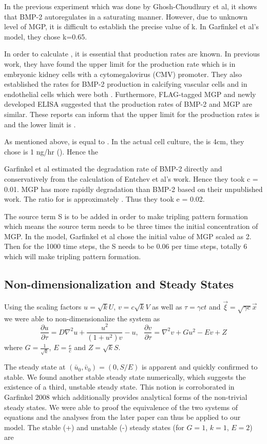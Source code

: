 \documentclass{article}
\begin{document}
In the previous experiment which was done by Ghosh-Choudhury et al, it shows that BMP-2 autoregulates in a saturating manner. However, due to unknown level of MGP, it is difficult to establish the precise value of k. In Garfinkel et al’s model, they chose k=0.65.

In order to calculate , it is essential that production rates are known. In previous work, they have found the upper limit for the production rate which is in embryonic kidney cells with a cytomegalovirus (CMV) promoter. They also established the rates for BMP-2 production in calcifying vascular cells and in endothelial cells which were both . Furthermore, FLAG-tagged MGP and newly developed ELISA suggested that the production rates of BMP-2 and MGP are similar. These reports can inform that the upper limit for the production rates is  and the lower limit is .

 As mentioned above,  is equal to . In the actual cell culture, the is 4cm,  they chose is 1 ng/hr (). Hence the 

Garfinkel et al estimated the degradation rate of BMP-2 directly and conservatively from the calculation of Entchev et al’s work. Hence they took c = 0.01. MGP has more rapidly degradation than BMP-2 based on their unpublished work. The ratio for  is approximately . Thus they took e = 0.02.

The source term S is to be added in order to make tripling pattern formation which means the source term needs to be three times the initial concentration of MGP. In the model, Garfinkel et al chose the initial value of MGP scaled as 2. Then for the 1000 time steps, the S needs to be 0.06 per time steps, totally 6 which will make tripling pattern formation.

\subsection{Non-dimensionalization and Steady States}

Using the scaling factors $u=\sqrt{k}U$, $v=c\sqrt{k}V$ as well as $\tau = \gamma c t$ and $\vec{\xi}=\sqrt{\gamma c} \vec{x}$ we were able to non-dimensionalize the system as
$$\frac{\partial u}{\partial \tau} = D\nabla^2 u + \frac{u^2}{(1+u^2)v}-u,\ \ \ \frac{\partial v}{\partial \tau} = \nabla^2 v + G u^2 - E v + Z$$
where $G=\frac{1}{\sqrt{k}}$, $E=\frac{e}{c}$ and $Z=\sqrt{k}S$.


The steady state at $(\bar u_0,\bar v_0)=(0,S/E)$ is apparent and quickly confirmed to stable. We found another stable steady state numerically, which suggests the existence of a third, unstable steady state.
This notion is corroborated in Garfinkel 2008 which additionally provides analytical forms of the non-trivial steady states. We were able to proof the equivalence of the two systems of equations and the analyses from the later paper can thus be applied to  our model. The stable (+) and unstable (-) steady states (for $G=1$, $k=1$, $E=2$) are
\end{document}
